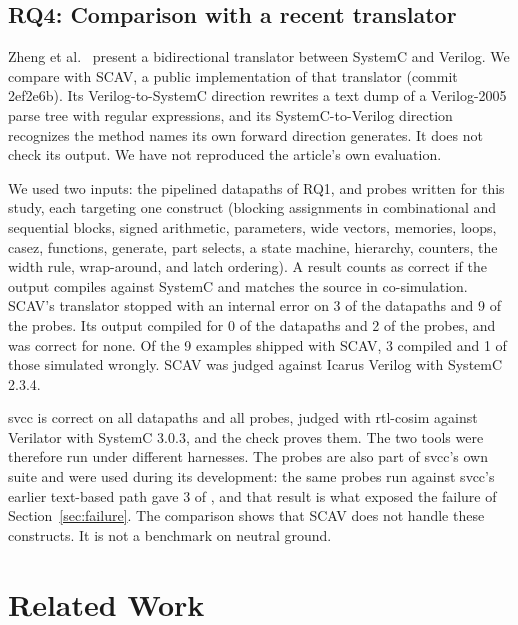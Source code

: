 \documentclass[conference]{IEEEtran}
\newcommand{\code}[1]{{\fontshape{n}\ttfamily #1}}
\begin{document}
\subsection{RQ4: Comparison with a recent translator}
\label{sec:scav}

Zheng et al.~\cite{zheng2026bidir} present a bidirectional translator between SystemC and Verilog.
We compare with SCAV, a public implementation of that translator (commit \code{2ef2e6b}). Its
Verilog-to-SystemC direction rewrites a text dump of a Verilog-2005 parse tree with regular
expressions, and its SystemC-to-Verilog direction recognizes the method names its own forward
direction generates. It does not check its output. We have not reproduced the article's own
evaluation.

We used two inputs: the \nCorpusRtl{} pipelined datapaths of RQ1, and \nProbes{} probes written
for this study, each targeting one construct (blocking assignments in combinational and sequential
blocks, signed arithmetic, parameters, wide vectors, memories, loops, \code{casez}, functions,
generate, part selects, a state machine, hierarchy, counters, the width rule, wrap-around, and
latch ordering). A result counts as correct if the output compiles against SystemC and matches the
source in co-simulation. SCAV's translator stopped with an internal error on 3 of the
\nCorpusRtl{} datapaths and 9 of the \nProbes{} probes. Its output compiled for 0 of the datapaths
and 2 of the probes, and was correct for none. Of the 9 examples shipped with SCAV, 3 compiled and 1
of those simulated wrongly. SCAV was judged against Icarus Verilog with SystemC 2.3.4.

\code{svcc} is correct on all \nCorpusRtl{} datapaths and all \nProbes{} probes, judged with
\code{rtl-cosim} against Verilator with SystemC 3.0.3, and the check proves them. The two tools were
therefore run under different harnesses. The probes are also part of \code{svcc}'s own suite and
were used during its development: the same probes run against \code{svcc}'s earlier text-based path
gave 3 of \nProbes{}, and that result is what exposed the failure of Section~\ref{sec:failure}. The
comparison shows that SCAV does not handle these constructs. It is not a benchmark on neutral
ground.

\section{Related Work}
\label{sec:related}
\end{document}
